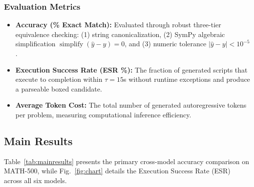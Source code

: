 \documentclass[conference,a4paper]{IEEEtran}
\begin{document}
\subsubsection{Evaluation Metrics}

\begin{itemize}
    \item \textbf{Accuracy (\% Exact Match):} Evaluated through robust three-tier equivalence checking: (1) string canonicalization, (2) SymPy algebraic simplification $\operatorname{simplify}(\hat{y} - y) = 0$, and (3) numeric tolerance $|\hat{y} - y| < 10^{-5}$.
    \item \textbf{Execution Success Rate (ESR \%):} The fraction of generated scripts that execute to completion within $\tau=15$s without runtime exceptions and produce a parseable boxed candidate.
    \item \textbf{Average Token Cost:} The total number of generated autoregressive tokens per problem, measuring computational inference efficiency.
\end{itemize}

\subsection{Main Results}
\label{sec:results}

Table~\ref{tab:mainresults} presents the primary cross-model accuracy comparison on MATH-500, while Fig.~\ref{fig:chart} details the Execution Success Rate (ESR) across all six models.

\begin{table}[t]
\centering
\caption{Cross-model answer accuracy (\%) on the full MATH-500 benchmark across six compact models (3B--8B). Best accuracy per model is in \textbf{bold}.}
\label{tab:mainresults}
\end{table}
\end{document}
